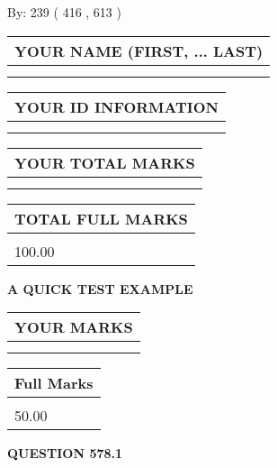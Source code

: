 \documentclass[12pt]{article}
\begin{document}
   
\hspace{1.0in} By: 
 239 ( 416 ,  613 )
   
   
   
   
\newpage 
\setcounter{page}{ 
   578001 } 
   
   
   
   
\noindent\begin{tabular}{|l|}
\hline
YOUR NAME (FIRST, ... LAST)  \\
\hline
 \\ 
 \\ 
\hline
\end{tabular}
\hspace{0.05in} \begin{tabular}{|l|}
\hline
 YOUR   ID   INFORMATION  \\
\hline
 \\ 
 \\ 
\hline
\end{tabular}
   
   
\vspace{0.2in}\noindent\begin{tabular}{|l|}
\hline
YOUR TOTAL MARKS  \\
\hline
 \\ 
 \\ 
\hline
\end{tabular}
\hspace{0.05in} \begin{tabular}{|l|}
\hline
TOTAL FULL MARKS  \\
\hline
 \\ 
100.00 \\
\hline
\end{tabular}
   
   
 \vspace{0.2in}
{\LARGE {\textbf{ A QUICK TEST EXAMPLE}}}
   
   
  
\vspace{0.2in}
  
\noindent\begin{tabular}{|l|}
\hline
 YOUR MARKS  \\
\hline
 \\ 
 \\ 
\hline
\end{tabular}
\hspace{0.05in} \begin{tabular}{|l|}
\hline
 Full Marks  \\
\hline
 \\ 
50.00 \\
\hline
\end{tabular}
{\textbf{\Large{QUESTION
578.1 
}}}
  
\end{document}
